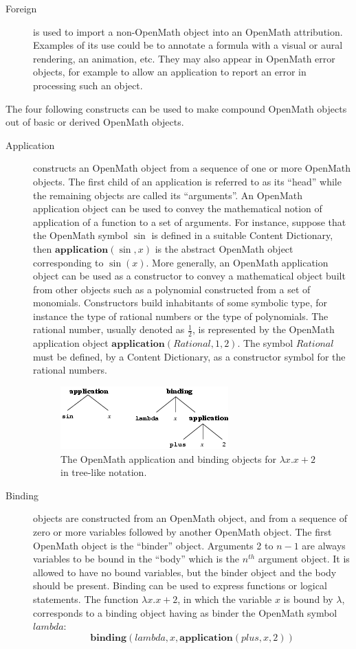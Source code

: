 \documentclass{report}
\def\textquote#1{``#1''}
\def\OM{OpenMath\xspace}
\def\application#1{\mathbf{application}(#1)}
\def\binding#1{\mathbf{binding}(#1)}
\begin{document}
\begin{description}
\item[Foreign] is used to import a non-\OM object into an \OM attribution.  Examples of
  its use could be to annotate a formula with a visual or aural rendering, an animation,
  etc.  They may also appear in \OM error objects, for example to allow an application to
  report an error in processing such an object.
\end{description}
The four following constructs can be used to make compound \OM objects out of basic or
derived \OM objects.

\begin{description}
\item[Application] constructs an \OM object from a sequence of one or more \OM
  objects. The first child of an application is referred to as its \textquote{head} while
  the remaining objects are called its \textquote{arguments}.  An \OM application object
  can be used to convey the mathematical notion of application of a function to a set of
  arguments.  For instance, suppose that the \OM symbol $\sin$ is defined in a suitable
  Content Dictionary, then $\application{\sin,x}$ is the abstract \OM object
  corresponding to $\sin(x)$.  More generally, an \OM application object can be used as a
  constructor to convey a mathematical object built from other objects such as a
  polynomial constructed from a set of monomials.  Constructors build inhabitants of some
  symbolic type, for instance the type of rational numbers or the type of polynomials.
  The rational number, usually denoted as $\frac12$, is
  represented by the \OM application object $\application{Rational,1,2}$. The symbol
  $Rational$ must be defined, by a Content Dictionary, as a
  constructor symbol for the rational numbers.

  \begin{figure}\centering
    \includegraphics{lambda}
    \caption{The \OM application and binding objects for $\lambda x.x+2$ in tree-like notation.}\label{fig_obj}
  \end{figure}

\item[Binding] objects are
  constructed from an \OM object, and from a sequence of zero or more
  variables followed by another \OM object.  The first \OM object is
  the \textquote{binder} object. Arguments 2 to $n-1$ are always variables to
  be bound in the \textquote{body} which is the $n^{th}$ argument object. It
  is allowed to have no bound variables, but the binder object and the
  body should be present. Binding can be used to express functions or
  logical statements.  The function $\lambda x.x+2$, in which
  the variable $x$ is bound by $\lambda$, corresponds to a binding object having
  as binder the \OM symbol $lambda$: 
\[\binding{lambda,x,\application{plus,x,2}}\]


\end{description}
\end{document}
